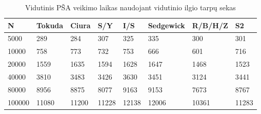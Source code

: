 \documentclass{VUMIFInfKursinis}
\begin{document}
\begin{table}[H]
  \caption{Vidutinis PŠA veikimo laikas naudojant vidutinio ilgio tarpų sekas}
  \label{iss_medium_runtimes}
  \begin{tabular}{|l|l|l|l|l|l|l|l|}
  \hline
  N      & Tokuda & Ciura & S/Y   & I/S   & Sedgewick & R/B/H/Z & S2   \\ \hline
  5000   & 289    & 284   & 307   & 325   & 335       & 300     & 301   \\ \hline
  10000  & 758    & 773   & 732   & 753   & 666       & 601     & 716   \\ \hline
  20000  & 1559   & 1635  & 1594  & 1628  & 1647      & 1468    & 1523  \\ \hline
  40000  & 3810   & 3483  & 3426  & 3630  & 3451      & 3124    & 3441  \\ \hline
  80000  & 8956   & 8875  & 8077  & 9163  & 9153      & 7673    & 8767  \\ \hline
  100000 & 11080  & 11200 & 11228 & 12138 & 12006     & 10361   & 11283 \\ \hline
  \end{tabular}
\end{table}
\end{document}
